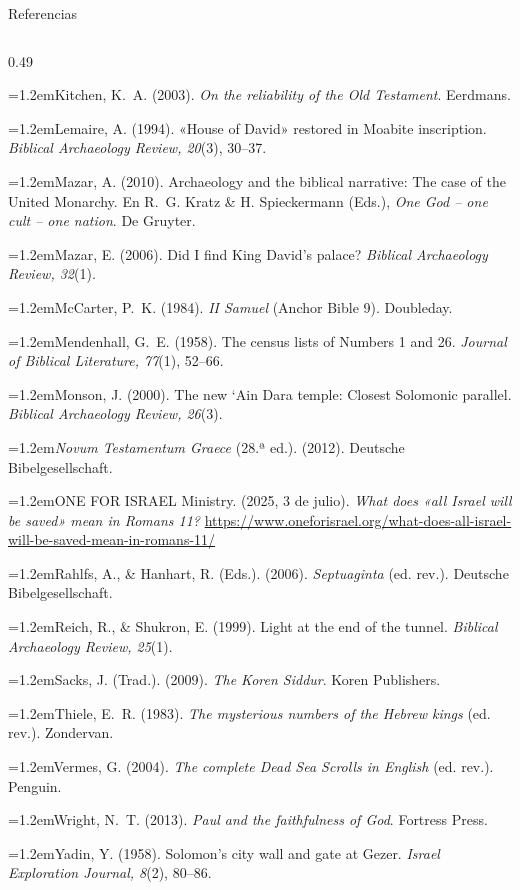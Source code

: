 \documentclass[hyperref={bookmarks=false},aspectratio=169]{beamer}
\newcommand{\refapa}[1]{\par\hangindent=1.2em\hangafter=1\noindent #1\par\vspace{3pt}}
\begin{document}
\begin{frame}{Referencias}
\begin{columns}[t,onlytextwidth]
\begin{column}{0.49\textwidth}
\refapa{Kitchen, K.~A. (2003). \emph{On the reliability of the Old Testament}. Eerdmans.}
\refapa{Lemaire, A. (1994). «House of David» restored in Moabite inscription. \emph{Biblical Archaeology Review, 20}(3), 30--37.}
\refapa{Mazar, A. (2010). Archaeology and the biblical narrative: The case of the United Monarchy. En R.~G. Kratz \& H. Spieckermann (Eds.), \emph{One God -- one cult -- one nation}. De Gruyter.}
\refapa{Mazar, E. (2006). Did I find King David's palace? \emph{Biblical Archaeology Review, 32}(1).}
\refapa{McCarter, P.~K. (1984). \emph{II Samuel} (Anchor Bible 9). Doubleday.}
\refapa{Mendenhall, G.~E. (1958). The census lists of Numbers 1 and 26. \emph{Journal of Biblical Literature, 77}(1), 52--66.}
\refapa{Monson, J. (2000). The new \textquoteleft Ain Dara temple: Closest Solomonic parallel. \emph{Biblical Archaeology Review, 26}(3).}
\refapa{\emph{Novum Testamentum Graece} (28.ª ed.). (2012). Deutsche Bibelgesellschaft.}
\refapa{ONE FOR ISRAEL Ministry. (2025, 3 de julio). \emph{What does «all Israel will be saved» mean in Romans 11?} \url{https://www.oneforisrael.org/what-does-all-israel-will-be-saved-mean-in-romans-11/}}
\refapa{Rahlfs, A., \& Hanhart, R. (Eds.). (2006). \emph{Septuaginta} (ed. rev.). Deutsche Bibelgesellschaft.}
\refapa{Reich, R., \& Shukron, E. (1999). Light at the end of the tunnel. \emph{Biblical Archaeology Review, 25}(1).}
\refapa{Sacks, J. (Trad.). (2009). \emph{The Koren Siddur}. Koren Publishers.}
\refapa{Thiele, E.~R. (1983). \emph{The mysterious numbers of the Hebrew kings} (ed. rev.). Zondervan.}
\refapa{Vermes, G. (2004). \emph{The complete Dead Sea Scrolls in English} (ed. rev.). Penguin.}
\refapa{Wright, N.~T. (2013). \emph{Paul and the faithfulness of God}. Fortress Press.}
\refapa{Yadin, Y. (1958). Solomon's city wall and gate at Gezer. \emph{Israel Exploration Journal, 8}(2), 80--86.}
\end{column}
\end{columns}
\end{frame}
\end{document}
